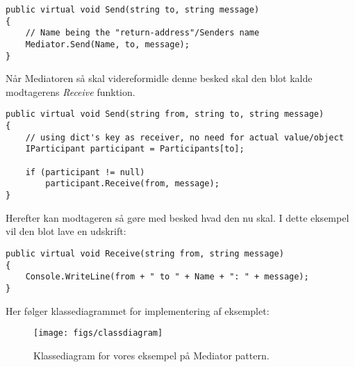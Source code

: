 \begin{lstlisting}
public virtual void Send(string to, string message)
{
	// Name being the "return-address"/Senders name
	Mediator.Send(Name, to, message);
}
\end{lstlisting}

Når Mediatoren så skal videreformidle denne besked skal den blot kalde modtagerens \textit{Receive} funktion.

\begin{lstlisting}
public virtual void Send(string from, string to, string message)
{
	// using dict's key as receiver, no need for actual value/object
	IParticipant participant = Participants[to];
	
	if (participant != null)
		participant.Receive(from, message);
}
\end{lstlisting}

Herefter kan modtageren så gøre med besked hvad den nu skal. I dette eksempel vil den blot lave en udskrift:

\begin{lstlisting}
public virtual void Receive(string from, string message)
{
	Console.WriteLine(from + " to " + Name + ": " + message);
}
\end{lstlisting}

Her følger klassediagrammet for implementering af eksemplet:

\begin{figure}[h]
	\centering
	\texttt{[image: figs/classdiagram]}
	\caption{Klassediagram for vores eksempel på Mediator pattern.}
	\label{fig:mediclass}
\end{figure}